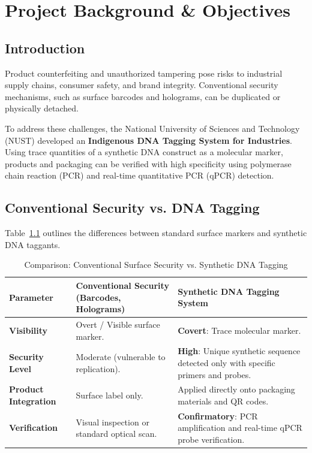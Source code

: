 \chapter{Project Background \& Objectives}
\label{chap:background}

\section{Introduction}
Product counterfeiting and unauthorized tampering pose risks to industrial supply chains, consumer safety, and brand integrity. Conventional security mechanisms, such as surface barcodes and holograms, can be duplicated or physically detached.

To address these challenges, the National University of Sciences and Technology (NUST) developed an \textbf{Indigenous DNA Tagging System for Industries}. Using trace quantities of a synthetic DNA construct as a molecular marker, products and packaging can be verified with high specificity using polymerase chain reaction (PCR) and real-time quantitative PCR (qPCR) detection.

\section{Conventional Security vs. DNA Tagging}
Table~\ref{tab:comparison} outlines the differences between standard surface markers and synthetic DNA taggants.

\begin{table}[H]
\centering
\small
\caption{Comparison: Conventional Surface Security vs. Synthetic DNA Tagging}
\label{tab:comparison}
\begin{tabularx}{\textwidth}{l X X}
\toprule
\textbf{Parameter} & \textbf{Conventional Security (Barcodes, Holograms)} & \textbf{Synthetic DNA Tagging System} \\
\midrule
\textbf{Visibility} & Overt / Visible surface marker. & \textbf{Covert}: Trace molecular marker. \\
\addlinespace
\textbf{Security Level} & Moderate (vulnerable to replication). & \textbf{High}: Unique synthetic sequence detected only with specific primers and probes. \\
\addlinespace
\textbf{Product Integration} & Surface label only. & Applied directly onto packaging materials and QR codes. \\
\addlinespace
\textbf{Verification} & Visual inspection or standard optical scan. & \textbf{Confirmatory}: PCR amplification and real-time qPCR probe verification. \\
\bottomrule
\end{tabularx}
\end{table}

